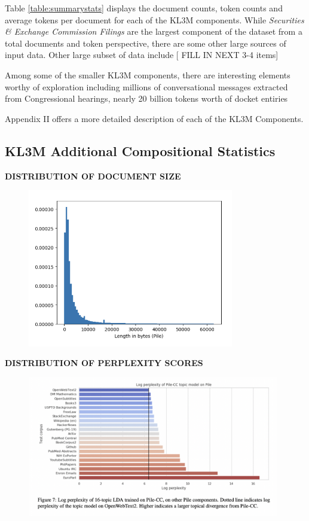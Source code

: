 Table \ref{table:summarystats} displays the document counts, token counts and average tokens per document for each of the KL3M components.  While \textit{Securities \& Exchange Commission Filings} are the largest component of the dataset from a total documents and token perspective, there are some other large sources of input data.  Other large subset of data include [ FILL IN NEXT 3-4 items]  

Among some of the smaller KL3M components, there are interesting elements worthy of exploration including millions of conversational messages extracted from Congressional hearings, nearly 20 billion tokens worth of docket entiries 

Appendix II offers a more detailed description of each of the KL3M Components.  




\subsection{KL3M Additional Compositional Statistics}

\textbf{DISTRIBUTION OF DOCUMENT SIZE}

\begin{figure}[h!]
\centering
\includegraphics[width=90mm]{PileDist.png}
\caption{}
\label{fig:Dist}
\end{figure}


\textbf{DISTRIBUTION OF PERPLEXITY SCORES}
\begin{figure}[h!]
\centering
\includegraphics[width=110mm]{Perplexity.png}
\caption{}
\label{fig:Perplexity}
\end{figure}


